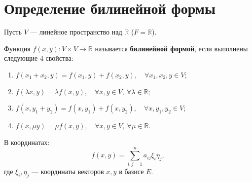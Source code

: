 \section{Определение билинейной формы}

\begin{definition}
Пусть $V$ --- линейное пространство над $\mathbb{R}$ ($F = \mathbb{R}$).

Функция $f(x, y): V \times V \to \mathbb{R}$ называется \textbf{билинейной формой}, если выполнены следующие 4 свойства:
\begin{enumerate}
    \item $f(x_1 + x_2, y) = f(x_1, y) + f(x_2, y),\quad \forall x_1, x_2, y \in V$;
    \item $f(\lambda x, y) = \lambda f(x, y),\quad \forall x, y \in V,\ \forall \lambda \in \mathbb{R}$;
    \item $f(x, y_1 + y_2) = f(x, y_1) + f(x, y_2),\quad \forall x, y_1, y_2 \in V$;
    \item $f(x, \mu y) = \mu f(x, y),\quad \forall x, y \in V,\ \forall \mu \in \mathbb{R}$.
\end{enumerate}

В координатах:
\[
f(x, y) = \sum_{i,j=1}^{n} a_{ij} \xi_i \eta_j,
\]
где $\xi_i, \eta_j$ --- координаты векторов $x, y$ в базисе $E$.
\end{definition}
